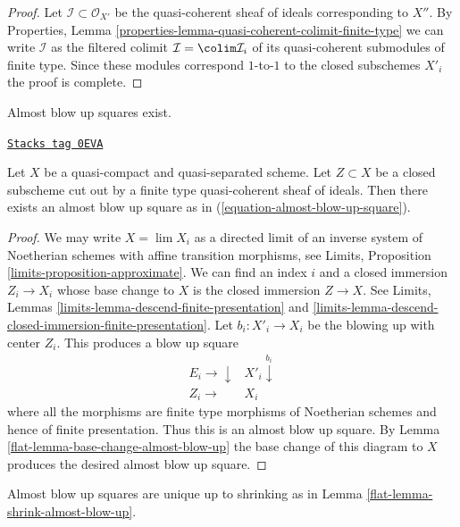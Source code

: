 \begin{proof}
Let $\mathcal{I} \subset \mathcal{O}_{X'}$ be the quasi-coherent
sheaf of ideals corresponding to $X''$. By
Properties, Lemma \ref{properties-lemma-quasi-coherent-colimit-finite-type}
we can write $\mathcal{I}$ as the filtered colimit
$\mathcal{I} = \colim \mathcal{I}_i$ of its quasi-coherent
submodules of finite type. Since these modules correspond
$1$-to-$1$ to the closed subschemes $X'_i$ the proof is complete.
\end{proof}

Almost blow up squares exist.

\begin{lemma}
\label{flat-lemma-almost-blow-up-square}
\href{https://stacks.math.columbia.edu/tag/0EVA}{\texttt{Stacks tag 0EVA}}

Let $X$ be a quasi-compact and quasi-separated scheme. Let $Z \subset X$
be a closed subscheme cut out by a finite type quasi-coherent
sheaf of ideals. Then there exists an almost blow up square as in
(\ref{equation-almost-blow-up-square}).
\end{lemma}

\begin{proof}

We may write $X = \lim X_i$ as a directed limit of an inverse system
of Noetherian schemes with affine transition morphisms, see
Limits, Proposition \ref{limits-proposition-approximate}.
We can find an index $i$ and a closed immersion $Z_i \to X_i$
whose base change to $X$ is the closed immersion $Z \to X$.
See Limits, Lemmas \ref{limits-lemma-descend-finite-presentation} and
\ref{limits-lemma-descend-closed-immersion-finite-presentation}.
Let $b_i : X'_i \to X_i$ be the blowing up with center $Z_i$.
This produces a blow up square
$$
\begin{array}{cc}E_i \longrightarrow\downarrow & X'_i \overset{b_i}{\downarrow} \\ Z_i \longrightarrow & X_i\end{array}
$$
where all the morphisms are finite type morphisms of Noetherian schemes
and hence of finite presentation. Thus this is an almost blow up square.
By Lemma \ref{flat-lemma-base-change-almost-blow-up}
the base change of this diagram to $X$ produces the desired
almost blow up square.
\end{proof}

Almost blow up squares are unique up to shrinking as in
Lemma \ref{flat-lemma-shrink-almost-blow-up}.

